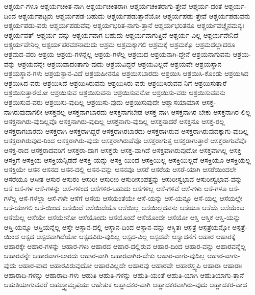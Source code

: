 {ಆಶ್ಚರ್ಯ-ಗಳೂ
ಆಶ್ಚರ್ಯಚಕಿತ-ನಾಗಿ
ಆಶ್ಚರ್ಯಚಕಿತರಾಗಿ
ಆಶ್ಚರ್ಯಚಕಿತರಾಗು-ತ್ತೇವೆ
ಆಶ್ಚರ್ಯ-ದಂತೆ
ಆಶ್ಚರ್ಯ-ದಿಂದ
ಆಶ್ಚರ್ಯಪಟ್ಟರು
ಆಶ್ಚರ್ಯಪಡ-ಬಹುದು
ಆಶ್ಚರ್ಯಪಡುತ್ತಾನೆಯೋ
ಆಶ್ಚರ್ಯಪಡು-ತ್ತೇವೆ
ಆಶ್ಚರ್ಯಪಡುವನು
ಆಶ್ಚರ್ಯಪಡು-ವರು
ಆಶ್ಚರ್ಯಪಡುವೆವು
ಆಶ್ಚರ್ಯಭರಿತ-ನಾಗು-ತ್ತಾನೆ
ಆಶ್ಚರ್ಯಭರಿತನೂ
ಆಶ್ಚರ್ಯವಚ್ಚೈನಮನ್ಯಃ
ಆಶ್ಚರ್ಯವತ್
ಆಶ್ಚರ್ಯ-ವನ್ನು
ಆಶ್ಚರ್ಯವಾಗ-ಬಹುದು
ಆಶ್ಚರ್ಯವಾಗುತ್ತಿದೆ
ಆಶ್ಚರ್ಯ-ವಿಲ್ಲ
ಆಶ್ಚರ್ಯವೇನಿದೆ
ಆಶ್ಚರ್ಯವೇನಿಲ್ಲ
ಆಶ್ಟರ್ಯಪರವಶನಾದುದು
ಆಶ್ರಮ
ಆಶ್ರಮಕ್ಕಾಗಲಿ
ಆಶ್ರಮಕ್ಕೆ
ಆಶ್ರಮಕ್ಕೊ
ಆಶ್ರಮದಲ್ಲಾದರೂ
ಆಶ್ರಮದ-ವರು
ಆಶ್ರಯ
ಆಶ್ರಯ-ಗಳನ್ನೆಲ್ಲ
ಆಶ್ರಯ-ಗಳೆಲ್ಲ
ಆಶ್ರಯದ
ಆಶ್ರಯನಾಗಿ-ದ್ದೇನೆ
ಆಶ್ರಯನಾಗುವನು
ಆಶ್ರಯ-ವನ್ನು
ಆಶ್ರಯವನ್ನೇ
ಆಶ್ರಯವಾದಂತಾಗು-ವುದು
ಆಶ್ರಯವಿದ್ದರೆ
ಆಶ್ರಯವಿಲ್ಲದೆ
ಆಶ್ರಯವೇ
ಆಶ್ರಯಸ್ಥಾನ
ಆಶ್ರಯಸ್ಥಾನ-ಗಳು
ಆಶ್ರಯಸ್ಥಾನ-ವಿದೆ
ಆಶ್ರಯಹೀನನೂ
ಆಶ್ರಯಿಸಬಾರದು
ಆಶ್ರಯಿಸಿ
ಆಶ್ರಯಿಸಿ-ಕೊಂಡು
ಆಶ್ರಯಿಸಿದ
ಆಶ್ರಯಿಸಿದ-ವರು
ಆಶ್ರಯಿಸಿದೆ
ಆಶ್ರಯಿಸಿರುವನು
ಆಶ್ರಯಿಸಿರು-ವರು
ಆಶ್ರಯಿಸಿರುವವ-ನಿಗೆ
ಆಶ್ರಯಿಸುತ್ತಾರೆ
ಆಶ್ರಯಿಸುತ್ತಾರೆಯೋ
ಆಶ್ರಯಿಸುವ
ಆಶ್ರಯಿಸುವನು
ಆಶ್ರಯಿಸುವನೋ
ಆಶ್ರಯಿಸು-ವರು
ಆಶ್ರಯಿಸುವವನು
ಆಶ್ರಯಿಸುವ-ವರು
ಆಶ್ರಯಿಸು-ವುದಿಲ್ಲ
ಆಶ್ರಯಿಸು-ವುದು
ಆಶ್ರಯಿಸುವುದೇ
ಆಶ್ವಾಸಯಾಮಾಸ
ಆಸಕ್ತ-ನಾಗಿರುವುದಾಗಲೀ
ಆಸಕ್ತನಲ್ಲ
ಆಸಕ್ತನಾಗಬಾರದು
ಆಸಕ್ತನಾಗಬೇಡ
ಆಸಕ್ತ-ನಾಗಿ
ಆಸಕ್ತನಾಗಿರ-ಬೇಕು
ಆಸಕ್ತನಾಗಿರ-ಲಿಲ್ಲ
ಆಸಕ್ತನಾಗಿರು-ವುದಿಲ್ಲವೊ
ಆಸಕ್ತನಾಗಿರು-ವುದಿಲ್ಲ
ಆಸಕ್ತನಾಗು-ವುದಿಲ್ಲ
ಆಸಕ್ತನಾದರೆ
ಆಸಕ್ತನೂ
ಆಸಕ್ತ-ರಲ್ಲ
ಆಸಕ್ತರಾಗಬಾರದು
ಆಸಕ್ತರಾಗಿ
ಆಸಕ್ತರಾಗಿದ್ದರೆ
ಆಸಕ್ತರಾಗಿರಬಾರದು
ಆಸಕ್ತರಾಗಿರುವ
ಆಸಕ್ತರಾಗಿರುವುದಕ್ಕಾಗು-ವುದಿಲ್ಲ
ಆಸಕ್ತರಾಗಿರುವುದ-ರಿಂದ
ಆಸಕ್ತರಾಗಿರು-ವುದು
ಆಸಕ್ತರಾಗಿರುವೆವೊ
ಆಸಕ್ತರಾಗುತ್ತ
ಆಸಕ್ತರಾಗುತ್ತಾರೆ
ಆಸಕ್ತರಾಗುವೆವೊ
ಆಸಕ್ತ-ರಾದ
ಆಸಕ್ತರಾದವರಿಗೆ
ಆಸಕ್ತರಾ-ದಾಗ
ಆಸಕ್ತರು
ಆಸಕ್ತ-ವಾಗಿದೆ
ಆಸಕ್ತವಾಗಿರುವುದೋ
ಆಸಕ್ತವಾಗಿಲ್ಲ
ಆಸಕ್ತಿ
ಆಸಕ್ತಿಗೆ
ಆಸಕ್ತಿಯ
ಆಸಕ್ತಿಯನ್ನಿಡದೆ
ಆಸಕ್ತಿ-ಯನ್ನು
ಆಸಕ್ತಿ-ಯಿಂದ
ಆಸಕ್ತಿಯಿಲ್ಲ
ಆಸಕ್ತಿಯಿಲ್ಲದೆ
ಆಸಕ್ತಿಯೂ
ಆಸಕ್ತಿಯೆಲ್ಲ
ಆಸಕ್ತಿಯೇ
ಆಸನ
ಆಸನದ
ಆಸನ-ದಲ್ಲಿ
ಆಸನ-ವನ್ನು
ಆಸನವೂ
ಆಸರೆ
ಆಸರೆಯ
ಆಸರೆ-ಯಾಗಿ
ಆಸರೆಯಿಂದಲೇ
ಆಸರೆಯೂ
ಆಸೀತ
ಆಸುರ
ಆಸುರಂ
ಆಸುರೀ
ಆಸುರೀಂ
ಆಸುರೀಸಂಪತ್ತನ್ನು
ಆಸುರೀಸ್ವಭಾವ
ಆಸುರೀಸ್ವಭಾವ-ವನ್ನು
ಆಸೆ
ಆಸೆ-ಗಳ
ಆಸೆ-ಗಳನ್ನು
ಆಸೆ-ಗಳಿಂದ
ಆಸೆಗಳಿರ-ಬಹುದು
ಆಸೆಗಳಿಲ್ಲ
ಆಸೆ-ಗಳಿವೆ
ಆಸೆ-ಗಳು
ಆಸೆ-ಗಳೂ
ಆಸೆ-ಗಳೆಲ್ಲ
ಆಸೆ-ಗಳೆಲ್ಲಾ
ಆಸೆ-ಗಳೇ
ಆಸೆಗೆ
ಆಸೆಯ
ಆಸೆಯಂತೆಯೇ
ಆಸೆ-ಯನ್ನು
ಆಸೆ-ಯನ್ನೂ
ಆಸೆ-ಯಲ್ಲ
ಆಸೆಯಲ್ಲೇ
ಆಸೆ-ಯಾಗಲಿ
ಆಸೆ-ಯಿಂದ
ಆಸೆಯಿದೆ
ಆಸೆಯಿದೆಯೊ
ಆಸೆಯಿಲ್ಲ
ಆಸೆಯಿಲ್ಲದವನು
ಆಸೆಯೂ
ಆಸೆಯೆ
ಆಸೆಯೆಂಬ
ಆಸೆಯೆಲ್ಲ
ಆಸೆಯೇ
ಆಸೆಯೇನೋ
ಆಸೆಯೊಂದು
ಆಸೆಯೊಂದೆ
ಆಸೆಯೊಂದೇ
ಆಸೆಯೋ
ಆಸ್ತಿ
ಆಸ್ತಿಕ
ಆಸ್ತಿ-ಯನ್ನು
ಆಸ್ತಿ-ಯನ್ನೂ
ಆಸ್ತಿಯನ್ನೆಲ್ಲ
ಆಸ್ತೇ
ಆಸ್ಥಾನ-ದಲ್ಲಿ
ಆಸ್ಥಾನ-ದಿಂದ
ಆಸ್ಥಾನ-ವನ್ನು
ಆಸ್ಥಿತಃ
ಆಸ್ಪತ್ರೆ
ಆಸ್ಪತ್ರೆಯನ್ನೋ
ಆಸ್ಪತ್ರೆ-ಯಿಂದ
ಆಸ್ಪದ
ಆಸ್ಪದವಾಗಿದೆಯೋ
ಆಸ್ಪದವಿರು-ವುದಿಲ್ಲ
ಆಸ್ಪದ-ವಿಲ್ಲ
ಆಸ್ಪದವೇ
ಆಸ್ವಾದನೆಗೆ
ಆಹಾರ
ಆಹಾರಕ್ಕೆ
ಆಹಾರಕ್ಕೇ
ಆಹಾರ-ಗಳನ್ನು
ಆಹಾರ-ಗಳು
ಆಹಾರದ
ಆಹಾರ-ದಲ್ಲಿರುವ
ಆಹಾರ-ದಿಂದ
ಆಹಾರ-ವನ್ನು
ಆಹಾರವನ್ನೆಲ್ಲ
ಆಹಾರವನ್ನೇ
ಆಹಾರವಾಗ-ಲಾರದು
ಆಹಾರ-ವಾಗಿ
ಆಹಾರವಾಗಿರ-ಬೇಕು
ಆಹಾರ-ವಾಗು-ವುದಿಲ್ಲ
ಆಹಾರ-ವಾಗು-ವುದು
ಆಹಾರ-ವಾದ
ಆಹಾರವಿರುವುದೋ
ಆಹಾರವಿಲ್ಲದೇ
ಆಹಾರವು
ಆಹಾರವೇ
ಆಹಾರಸ್ತ್ವಪಿ
ಆಹಾರಾ
ಆಹಾರಾಃ
ಆಹಾರಾದಿ-ಗಳನ್ನು
ಆಹಾರಾದಿ-ಗಳು
ಆಹುತಿ
ಆಹುತಿ-ಗಳನ್ನು
ಆಹುತಿ-ಯಂತೆ
ಆಹುತಿ-ಯಾಗಿ
ಆಹುತಿಯಾಗು-ತ್ತಾನೆ
ಆಹುತಿಯಾಗುವವರೆ
ಆಹುಸ್ತ್ವಾಮೃಷಯಃ
ಆಹೇತುಕ
ಆಹ್ಲಾದಕರ-ವಾಗಿ
ಆಹ್ಲಾದಕರವಾಗಿರು-ವುದು
ಆಹ್ಲಾದಕರ-ವಾದ
}
